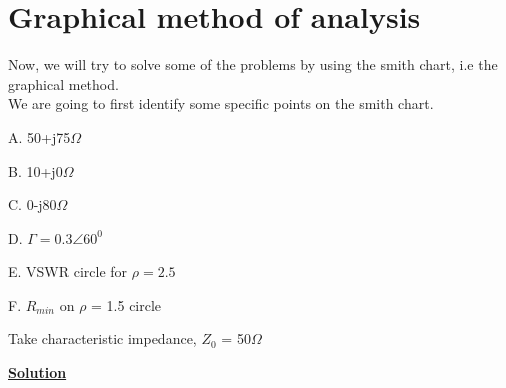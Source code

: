 \section{Graphical method of analysis}
\begin{example}
	Now, we will try to solve some of the problems by using the smith chart, i.e the graphical method.\\
	We are going to first identify some specific points on the smith chart.
	
	A. 50+j75$\Omega$
	
	B. 10+j0$\Omega$
	
	C. 0-j80$\Omega$
	
	D. $\Gamma=0.3\angle60^{0}$
	
	E. VSWR circle for $\rho=2.5$
	
	F. $R_{min}$ on $\rho$ = 1.5  circle
	
	Take characteristic impedance, $Z_{0}$ = 50$\Omega$
\end{example}

\begin{center}
	\textbf{\underline{\large Solution}}
\end{center}


